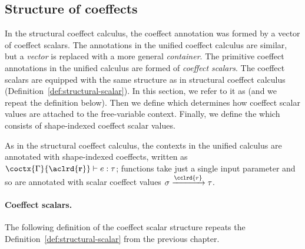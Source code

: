\subsection{Structure of coeffects}
In the structural coeffect calculus, the coeffect annotation was formed by a vector of coeffect
scalars. The annotations in the unified coeffect calculus are similar, but a \emph{vector} is
replaced with a more general \emph{container}. The primitive coeffect annotations in the unified
calculus are formed of \emph{coeffect scalars}. The coeffect scalars are equipped with the same
structure as in structural coeffect calculus (Definition~\ref{def:structural-scalar}). In this
section, we refer to it as \emph{} (and we repeat the definition
below). Then we define \emph{} which determines how coeffect
scalar values are attached to the free-variable context. Finally, we define the
\emph{} which consists of shape-indexed coeffect scalar values.

As in the structural coeffect calculus, the contexts in the unified calculus are annotated with
shape-indexed coeffects, written as $\coctx{\Gamma}{\aclrd{\textbf{r}}} \vdash e : \tau$;
functions take just a single input parameter and so are annotated with scalar coeffect values
$\sigma \xrightarrow{\cclrd{r}} \tau$.

\paragraph{Coeffect scalars.}
The following definition of the coeffect scalar structure repeats the
Definition~\ref{def:structural-scalar} from the previous chapter.

